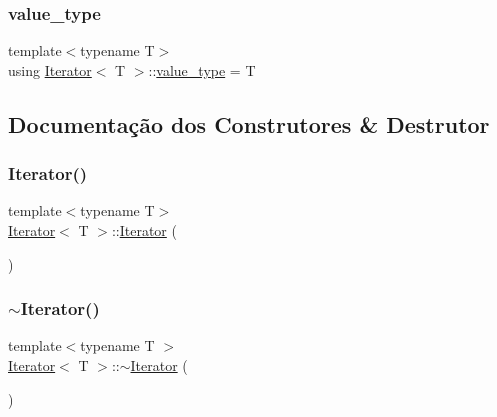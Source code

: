 \mbox{\label{classIterator_ab30ee4ae468e806a7897d6a0c7705c54}} 
\subsubsection{\texorpdfstring{value\+\_\+type}{value\_type}}
{\footnotesize\ttfamily template$<$typename T$>$ \\
using \hyperlink{classIterator}{Iterator}$<$ T $>$\+::\hyperlink{classIterator_ab30ee4ae468e806a7897d6a0c7705c54}{value\+\_\+type} =  T}



\subsection{Documentação dos Construtores \& Destrutor}
\mbox{\label{classIterator_a87d4af70ba6312e91e1ab6a7c9e2ec6d}} 
\subsubsection{\texorpdfstring{Iterator()}{Iterator()}\hspace{0.1cm}{\footnotesize\ttfamily [1/2]}}
{\footnotesize\ttfamily template$<$typename T$>$ \\
\hyperlink{classIterator}{Iterator}$<$ T $>$\+::\hyperlink{classIterator}{Iterator} (\begin{DoxyParamCaption}{ }\end{DoxyParamCaption})}

\mbox{\label{classIterator_ae3ca5d592c9550743e6bfe07e5881c13}} 
\subsubsection{\texorpdfstring{$\sim$\+Iterator()}{~Iterator()}}
{\footnotesize\ttfamily template$<$typename T $>$ \\
\hyperlink{classIterator}{Iterator}$<$ T $>$\+::$\sim$\hyperlink{classIterator}{Iterator} (\begin{DoxyParamCaption}{ }\end{DoxyParamCaption})\hspace{0.3cm}{\ttfamily [default]}}

